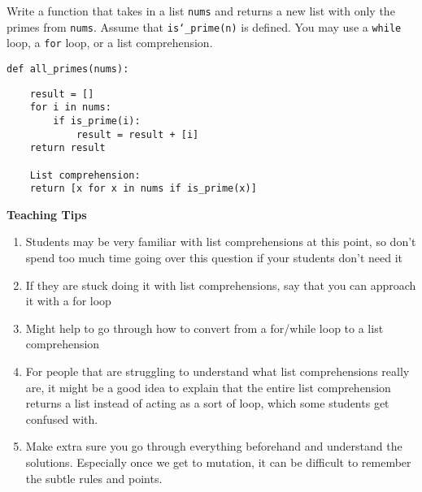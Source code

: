 \begin{blocksection}
\question Write a function that takes in a list \texttt{nums} and returns a
new list with only the primes from \texttt{nums}. Assume that
\texttt{is\char`_prime(n)} is defined. You may use a \texttt{while} loop, a
\texttt{for} loop, or a list comprehension.

\begin{lstlisting}
def all_primes(nums):
\end{lstlisting}
\begin{solution}[2in]
\begin{lstlisting}
    result = []
    for i in nums:
        if is_prime(i):
            result = result + [i]
    return result

    List comprehension:
    return [x for x in nums if is_prime(x)]
\end{lstlisting}
\end{solution}
\end{blocksection}

\begin{blocksection}
	\begin{guide}
	\textbf{Teaching Tips}
	\begin{enumerate}
			\item Students may be very familiar with list comprehensions at this point, so don’t spend too much time going over this question if your students don’t need it
            \item  If they are stuck doing it with list comprehensions, say that you can approach it with a for loop
            \item Might help to go through how to convert from a for/while loop to a list comprehension
            \item For people that are struggling to understand what list comprehensions really are, it might be a good idea to explain that the entire list comprehension returns a list instead of acting as a sort of loop, which some students get confused with.
            \item Make extra sure you go through everything beforehand and understand the solutions. Especially once we get to mutation, it can be difficult to remember the subtle rules and points.
	\end{enumerate}
	\end{guide}
\end{blocksection}